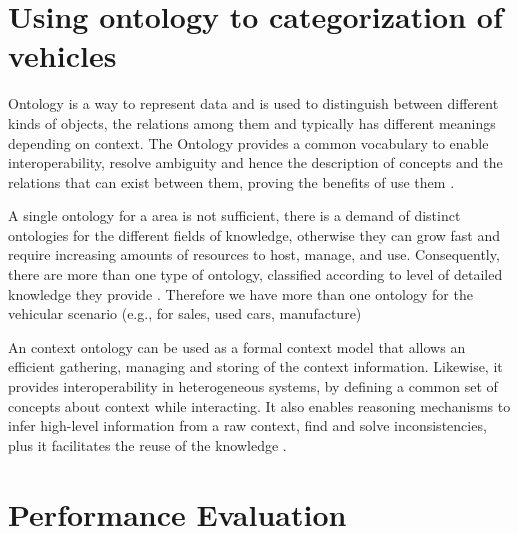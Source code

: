 \documentclass[conference]{IEEEtran}
\begin{document}
\section{Using ontology to categorization of vehicles}

Ontology is a way to represent data and is used to distinguish between different kinds of objects, the relations among them and typically has different meanings depending on context. The Ontology provides a common vocabulary to enable interoperability, resolve ambiguity and hence the description of concepts and the relations that can exist between them, proving the benefits of use them \cite{madkour2011}.

A single ontology for a area is not sufficient, there is a demand of distinct ontologies for the different fields of knowledge, otherwise they can grow fast and require increasing amounts of resources to host, manage, and use. Consequently, there are more than one type of ontology, classified according to level of detailed knowledge they provide \cite{packer2010}. Therefore we have more than one ontology for the vehicular scenario (e.g., for sales, used cars, manufacture)

An context ontology can be used as a formal context model that allows an efficient gathering, managing and storing of the context information. Likewise, it provides interoperability in heterogeneous systems, by defining a common set of concepts about context while interacting. It also enables reasoning mechanisms to infer high-level information from a raw context, find and solve inconsistencies, plus it facilitates the reuse of the knowledge \cite{serrano2007}.




\section{Performance Evaluation}
\end{document}
